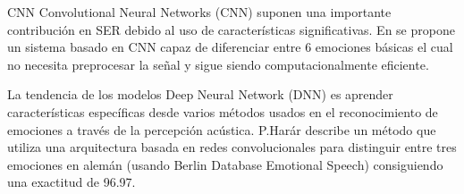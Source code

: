 \documentclass[11pt,a4paper,spanish]{book}
\begin{document}
	CNN
	Convolutional Neural Networks (CNN) suponen una importante contribución en SER debido al uso de características significativas. En %
	se propone un sistema basado en CNN capaz de diferenciar entre 6 emociones básicas el cual no necesita preprocesar la señal y sigue siendo computacionalmente eficiente.

	La tendencia de los modelos Deep Neural Network (DNN) es aprender características específicas desde varios métodos usados en el reconocimiento de emociones a través de la percepción acústica.
	P.Harár \cite{Harar2017} describe un método que utiliza una arquitectura basada en redes convolucionales para distinguir entre tres emociones en alemán (usando Berlin Database Emotional Speech) consiguiendo una exactitud de 96.97.
	
	
	
	\printbibliography
	
\end{document}
